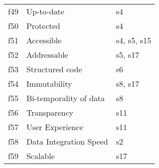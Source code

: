 \begin{tabular}{|c|p{}|p{}|}
f49 & Up-to-date & \cellcolor{emerald_shape_1} {s4}\\
f50 & Protected & \cellcolor{emerald_shape_1} {s4}\\
f51 & Accessible & \cellcolor{emerald_shape_2} {s4, s5, s15}\\
f52 & Addressable & \cellcolor{emerald_shape_1} {s5, s17}\\
f53 & Structured code & \cellcolor{emerald_shape_1} {s6}\\
f54 & Immutability & \cellcolor{emerald_shape_1} {s8, s17}\\
f55 & Bi-temporality of data & \cellcolor{emerald_shape_1} {s8}\\
f56 & Transparency & \cellcolor{emerald_shape_1} {s11}\\
f57 & User Experience & \cellcolor{emerald_shape_1} {s11}\\
f58 & Data Integration Speed & \cellcolor{emerald_shape_1} {s2}\\
f59 & Scalable & \cellcolor{emerald_shape_1} {s17}\\
\hline
\end{tabular}
